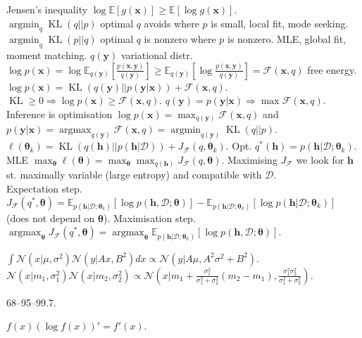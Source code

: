 \documentclass[twocolumn]{article}
\DeclareMathOperator*{\argmax}{argmax}
\DeclareMathOperator*{\argmin}{argmin}
\begin{document}
Jensen's inequality $\log\mathbb{E}[g(\mathbf{x})]\ge\mathbb{E}[\log g(\mathbf{x})]$.\\
$\argmin_q \operatorname{KL}(q||p)$ optimal $q$ avoids where $p$ is small, local fit, mode seeking. $\argmin_q \operatorname{KL}(p||q)$ optimal $q$ is nonzero where $p$ is nonzero. MLE, global fit, moment matching. $q(\mathbf{y})$ variational distr.\\
$\log p(\mathbf{x})=\log\mathbb{E}_{q(\mathbf{y})}\left[\frac{p(\mathbf{x},\mathbf{y})}{q(\mathbf{y})}\right]\ge\mathbb{E}_{q(\mathbf{y})}\left[\log\frac{p(\mathbf{x},\mathbf{y})}{q(\mathbf{y})}\right]=\mathcal{F}(\mathbf{x},q)$ free energy. $\log p(\mathbf{x})=\operatorname{KL}(q(\mathbf{y})||p(\mathbf{y}|\mathbf{x}))+\mathcal{F}(\mathbf{x},q)$.\\
$\operatorname{KL}\ge0\Rightarrow\log p(\mathbf{x})\ge\mathcal{F}(\mathbf{x},q)$.
$q(\mathbf{y})=p(\mathbf{y}|\mathbf{x})\Rightarrow\max\mathcal{F}(\mathbf{x},q)$.\\
Inference is optimisation $\log p(\mathbf{x})=\max_{q(\mathbf{y})}\mathcal{F}(\mathbf{x},q)$ and $p(\mathbf{y}|\mathbf{x})=\argmax_{q(\mathbf{y})}\mathcal{F}(\mathbf{x},q)=\argmin_{q(\mathbf{y})}\operatorname{KL}(q||p)$.\\
$\ell(\bm{\theta}_k)=\operatorname{KL}(q(\mathbf{h})||p(\mathbf{h}|\mathcal{D}))+J_\mathcal{F}(q,\bm{\theta}_k)$. Opt. $q^*(\mathbf{h})=p(\mathbf{h}|\mathcal{D};\bm{\theta}_k)$.\\
MLE $\max_{\bm{\theta}}\ell(\bm{\theta})=\max_{\bm{\theta}}\max_{q(\mathbf{h})}J_\mathcal{F}(q,\bm{\theta})$. Maximising $J_\mathcal{F}$ we look for $\mathbf{h}$ st. maximally variable (large entropy) and compatible with $\mathcal{D}$.\\
Expectation step. $J_\mathcal{F}(q^*,\bm{\theta})=\mathbb{E}_{p(\mathbf{h}|\mathcal{D};\bm{\theta}_k)}[\log p(\mathbf{h},\mathcal{D};\bm{\theta})]-\mathbb{E}_{p(\mathbf{h}|\mathcal{D};\bm{\theta}_k)}[\log p(\mathbf{h}|\mathcal{D};\bm{\theta}_k)]$ (does not depend on $\bm{\theta}$).
Maximisation step. $\argmax_{\bm{\theta}}J_\mathcal{F}(q^*,\bm{\theta})=\argmax_{\bm{\theta}}\mathbb{E}_{p(\mathbf{h}|\mathcal{D};\bm{\theta}_k)}[\log p(\mathbf{h},\mathcal{D};\bm{\theta})]$.

$\int\mathcal{N}(x|\mu,\sigma^2)\mathcal{N}(y|Ax,B^2)dx\propto\mathcal{N}(y|A\mu,A^2\sigma^2+B^2)$.\\
$\mathcal{N}(x|m_1,\sigma_1^2)\mathcal{N}(x|m_2,\sigma_2^2)\propto\mathcal{N}(x|m_1+\frac{\sigma_1^2}{\sigma_1^2+\sigma_2^2}(m_2-m_1),\frac{\sigma_1^2\sigma_2^2}{\sigma_1^2+\sigma_2^2})$.

68–95–99.7.

$f(x)(\log f(x))'=f'(x)$.
\end{document}

